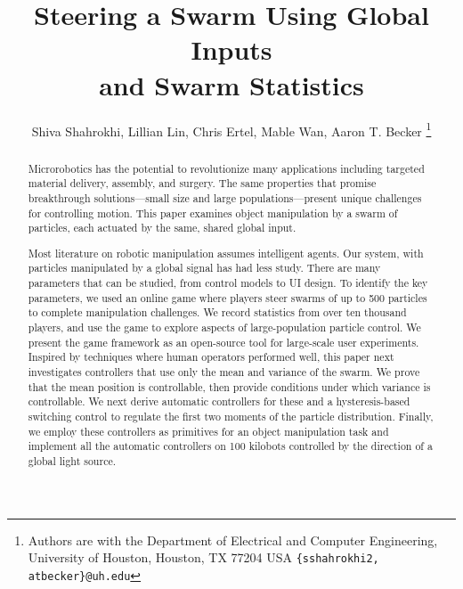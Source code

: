 \documentclass[conference]{IEEEtran}
\title{\LARGE \bf Steering a Swarm Using Global Inputs\\ and Swarm Statistics}
\author{Shiva Shahrokhi, Lillian Lin, Chris Ertel, Mable Wan,  Aaron T. Becker%
\thanks{Authors are with the Department of Electrical and Computer Engineering,  University of Houston, Houston, TX 77204 USA        {\tt\small  \{sshahrokhi2, atbecker\}@uh.edu}}
}
\begin{document}
\maketitle
\thispagestyle{empty}
\pagestyle{empty}
\begin{abstract}
Microrobotics has the potential to revolutionize many applications including targeted material delivery, assembly, and surgery.  The same properties that promise breakthrough solutions---small size and large populations---present unique challenges for controlling motion. 
This paper examines object manipulation by a swarm of particles, each actuated by the same, shared global input.

Most literature on robotic manipulation assumes intelligent agents.  Our system, with particles manipulated by a global signal has had less study.
There are many parameters that can be studied, from control models to UI design. 
To identify the key parameters, we used
an online game where players steer swarms of up to 500 particles to complete manipulation challenges. We record statistics from over ten thousand players, and use the game to explore aspects of large-population particle control. We present the game framework as an open-source tool for large-scale user experiments. 
Inspired by techniques where human operators performed well, this paper next investigates controllers that use only the mean and variance of the swarm. We prove that the mean position is controllable, then provide conditions under which variance is controllable.  We next derive automatic controllers for these and a hysteresis-based switching control to regulate the first two moments of the particle distribution. 
 Finally, we employ these controllers as primitives for an object manipulation task and implement all the automatic controllers on 100 kilobots controlled by the direction of a global light source.
\end{abstract}



%









\end{document}
